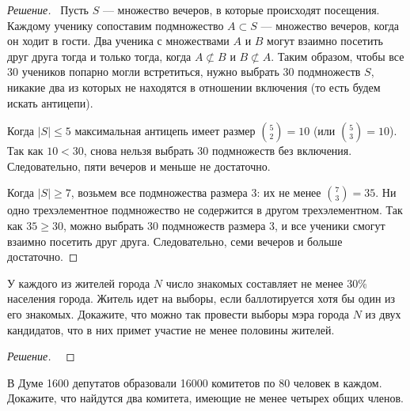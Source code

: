 \documentclass{article}
\begin{document}
\begin{proof}[Решение]\
Пусть $S$ — множество вечеров, в которые происходят посещения. Каждому ученику сопоставим подмножество $A \subset S$ — множество вечеров, когда он ходит в гости. Два ученика с множествами $A$ и $B$ могут взаимно посетить друг друга тогда и только тогда, когда $A \not\subset B$ и $B \not\subset A$. Таким образом, чтобы все 30 учеников попарно могли встретиться, нужно выбрать 30 подмножеств $S$, никакие два из которых не находятся в отношении включения (то есть будем искать антицепи).

Когда $|S| \le 5$ максимальная антицепь имеет размер $\binom{5}{2} = 10$ (или $\binom{5}{3} = 10$). Так как $10 < 30$, снова нельзя выбрать 30 подмножеств без включения. Следовательно, пяти вечеров и меньше не достаточно.

Когда $|S| \ge 7$, возьмем все подмножества размера 3: их не менее $\binom{7}{3} = 35$. Ни одно трехэлементное подмножество не содержится в другом трехэлементном. Так как $35 \ge 30$, можно выбрать 30 подмножеств размера 3, и все ученики смогут взаимно посетить друг друга. Следовательно, семи вечеров и больше достаточно.
\end{proof}

\begin{task}[3]
У каждого из жителей города $N$ число знакомых составляет не менее 30\% населения города. Житель идет на выборы, если баллотируется хотя бы один из его знакомых. Докажите, что можно так провести выборы мэра города $N$ из двух кандидатов, что в них примет участие не менее половины жителей.
\end{task}

\begin{proof}[Решение]\

\end{proof}

\begin{task}[3]
В Думе 1600 депутатов образовали 16000 комитетов по 80 человек в каждом. Докажите, что найдутся два комитета, имеющие не менее четырех общих членов.
\end{task}
\end{document}
